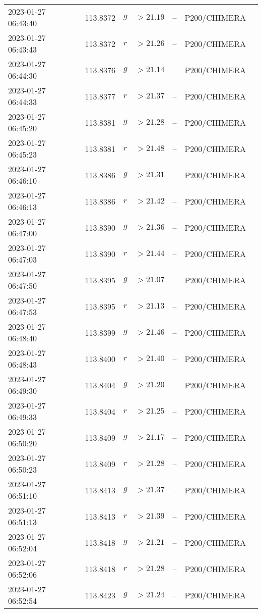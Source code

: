 \documentclass{nature_plusfigure}
\begin{document}
\begin{supplement}
\begin{center}
\begin{longtable}{lllllll}
2023-01-27 06:43:40 & 113.8372 & $g$ & $>21.19$ & -- & P200/CHIMERA &  \\ 
2023-01-27 06:43:43 & 113.8372 & $r$ & $>21.26$ & -- & P200/CHIMERA &  \\ 
2023-01-27 06:44:30 & 113.8376 & $g$ & $>21.14$ & -- & P200/CHIMERA &  \\ 
2023-01-27 06:44:33 & 113.8377 & $r$ & $>21.37$ & -- & P200/CHIMERA &  \\ 
2023-01-27 06:45:20 & 113.8381 & $g$ & $>21.28$ & -- & P200/CHIMERA &  \\ 
2023-01-27 06:45:23 & 113.8381 & $r$ & $>21.48$ & -- & P200/CHIMERA &  \\ 
2023-01-27 06:46:10 & 113.8386 & $g$ & $>21.31$ & -- & P200/CHIMERA &  \\ 
2023-01-27 06:46:13 & 113.8386 & $r$ & $>21.42$ & -- & P200/CHIMERA &  \\ 
2023-01-27 06:47:00 & 113.8390 & $g$ & $>21.36$ & -- & P200/CHIMERA &  \\ 
2023-01-27 06:47:03 & 113.8390 & $r$ & $>21.44$ & -- & P200/CHIMERA &  \\ 
2023-01-27 06:47:50 & 113.8395 & $g$ & $>21.07$ & -- & P200/CHIMERA &  \\ 
2023-01-27 06:47:53 & 113.8395 & $r$ & $>21.13$ & -- & P200/CHIMERA &  \\ 
2023-01-27 06:48:40 & 113.8399 & $g$ & $>21.46$ & -- & P200/CHIMERA &  \\ 
2023-01-27 06:48:43 & 113.8400 & $r$ & $>21.40$ & -- & P200/CHIMERA &  \\ 
2023-01-27 06:49:30 & 113.8404 & $g$ & $>21.20$ & -- & P200/CHIMERA &  \\ 
2023-01-27 06:49:33 & 113.8404 & $r$ & $>21.25$ & -- & P200/CHIMERA &  \\ 
2023-01-27 06:50:20 & 113.8409 & $g$ & $>21.17$ & -- & P200/CHIMERA &  \\ 
2023-01-27 06:50:23 & 113.8409 & $r$ & $>21.28$ & -- & P200/CHIMERA &  \\ 
2023-01-27 06:51:10 & 113.8413 & $g$ & $>21.37$ & -- & P200/CHIMERA &  \\ 
2023-01-27 06:51:13 & 113.8413 & $r$ & $>21.39$ & -- & P200/CHIMERA &  \\ 
2023-01-27 06:52:04 & 113.8418 & $g$ & $>21.21$ & -- & P200/CHIMERA &  \\ 
2023-01-27 06:52:06 & 113.8418 & $r$ & $>21.28$ & -- & P200/CHIMERA &  \\ 
2023-01-27 06:52:54 & 113.8423 & $g$ & $>21.24$ & -- & P200/CHIMERA &  \\ 

\end{longtable}
\end{center}
\end{supplement}
\end{document}
